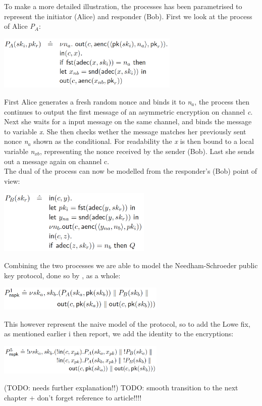 \noindent To make a more detailed illustration, the processes has been parametrised to represent the initiator (Alice) and responder (Bob). First we look at the process of Alice \textit{P$_A$}:
\begin{center}
\includegraphics[width=0.65\textwidth, angle=0]{Graphics/P_A.pdf}
\end{center}
First Alice generates a fresh random nonce and binds it to \textit{n$_a$}, the process then continues to output the first message of an asymmetric encryption on channel \textit{c}. Next she waits for a input message on the same channel, and binds the message to variable \textit{x}. She then checks wether the message matches her previously sent nonce \textit{n$_a$} shown as the conditional. For readability the \textit{x} is then bound to a local variable \textit{n$_{xb}$}, representing the nonce received by the sender (Bob). Last she sends out a message again on channel c. \\

\noindent The dual of the process can now be modelled from the responder's (Bob) point of view:
\begin{center}
\includegraphics[width=0.55\textwidth, angle=0]{Graphics/P_B.pdf}
\end{center}

\noindent Combining the two processes we are able to model the Needham-Schroeder public key protocol, done so by \citeauthor{DBLP:journals/ftpl/CortierK14}, as a whole: 
\begin{center}
\includegraphics[width=0.6\textwidth, angle=0]{Graphics/P1_nspk.pdf}
\end{center}
This however represent the naive model of the protocol, so to add the Lowe fix, as mentioned earlier i then report, we add the identity to the encryptions:
\begin{center}
\includegraphics[width=0.6\textwidth, angle=0]{Graphics/P5_nspk.pdf}
\end{center}
(TODO: needs further explanation!!)
TODO: smooth transition to the next chapter + don't forget reference to article!!!!


